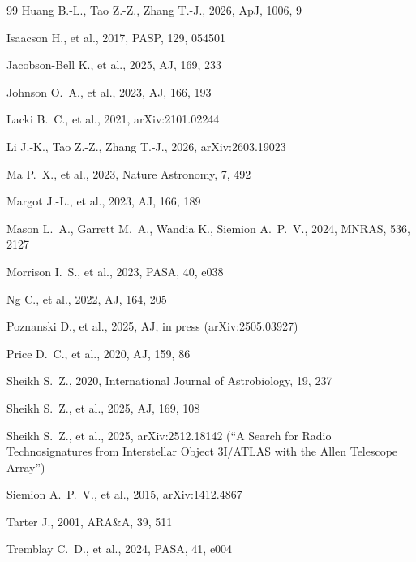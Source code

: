 \documentclass{openjournal}
\begin{document}
\begin{thebibliography}{99}
 Huang B.-L., Tao Z.-Z., Zhang T.-J., 2026, ApJ, 1006, 9

 Isaacson H., et al., 2017, PASP, 129, 054501

 Jacobson-Bell K., et al., 2025, AJ, 169, 233

 Johnson O.~A., et al., 2023, AJ, 166, 193

 Lacki B.~C., et al., 2021, arXiv:2101.02244

 Li J.-K., Tao Z.-Z., Zhang T.-J., 2026, arXiv:2603.19023

 Ma P.~X., et al., 2023, Nature Astronomy, 7, 492

 Margot J.-L., et al., 2023, AJ, 166, 189

 Mason L.~A., Garrett M.~A., Wandia K., Siemion A.~P.~V., 2024, MNRAS, 536, 2127

 Morrison I.~S., et al., 2023, PASA, 40, e038

 Ng C., et al., 2022, AJ, 164, 205

 Poznanski D., et al., 2025, AJ, in press (arXiv:2505.03927)

 Price D.~C., et al., 2020, AJ, 159, 86

 Sheikh S.~Z., 2020, International Journal of Astrobiology, 19, 237

 Sheikh S.~Z., et al., 2025, AJ, 169, 108

 Sheikh S.~Z., et al., 2025, arXiv:2512.18142 (``A Search for Radio Technosignatures from Interstellar Object 3I/ATLAS with the Allen Telescope Array'')

 Siemion A.~P.~V., et al., 2015, arXiv:1412.4867

 Tarter J., 2001, ARA\&A, 39, 511

 Tremblay C.~D., et al., 2024, PASA, 41, e004


\end{thebibliography}
\end{document}
